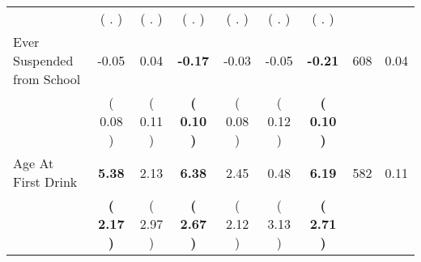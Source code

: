\begin{tabular}{lcccccccc}
 & (        . ) & (        . ) & (        . ) & (        . ) & (        . ) & (        . ) & \\
Ever Suspended from School &     -0.05 &      0.04 & \textbf{    -0.17} &     -0.03 &     -0.05 & \textbf{    -0.21} & 608 &       0.04 \\ 
 & (     0.08 ) & (     0.11 ) & \textbf{(     0.10 )} & (     0.08 ) & (     0.12 ) & \textbf{(     0.10 )} & \\
Age At First Drink & \textbf{     5.38} &      2.13 & \textbf{     6.38} &      2.45 &      0.48 & \textbf{     6.19} & 582 &       0.11 \\ 
 & \textbf{(     2.17 )} & (     2.97 ) & \textbf{(     2.67 )} & (     2.12 ) & (     3.13 ) & \textbf{(     2.71 )} & \\
\bottomrule
\end{tabular}
